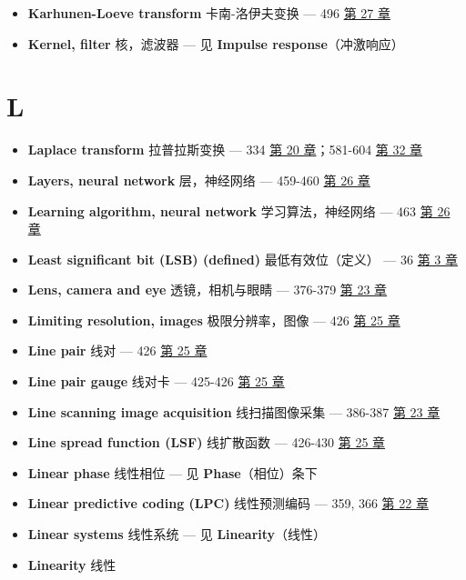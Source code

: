 \begin{itemize}
\tightlist
\item
  \textbf{Karhunen-Loeve transform} 卡南-洛伊夫变换 --- 496 
  \hyperref[ch-27]{第 27 章}
\item
  \textbf{Kernel, filter} 核，滤波器 --- 见 \textbf{Impulse
  response}（冲激响应）
\end{itemize}

\section{L}

\begin{itemize}
\tightlist
\item
  \textbf{Laplace transform} 拉普拉斯变换 --- 334 
  \hyperref[ch-20]{第 20 章}；581-604  \hyperref[ch-32]{第 32
  章}
\item
  \textbf{Layers, neural network} 层，神经网络 --- 459-460 
  \hyperref[ch-26]{第 26 章}
\item
  \textbf{Learning algorithm, neural network} 学习算法，神经网络 --- 463
   \hyperref[ch-26]{第 26 章}
\item
  \textbf{Least significant bit (LSB) (defined)} 最低有效位（定义） ---
  36  \hyperref[ch-03]{第 3 章}
\item
  \textbf{Lens, camera and eye} 透镜，相机与眼睛 --- 376-379 
  \hyperref[ch-23]{第 23 章}
\item
  \textbf{Limiting resolution, images} 极限分辨率，图像 --- 426
   \hyperref[ch-25]{第 25 章}
\item
  \textbf{Line pair} 线对 --- 426  \hyperref[ch-25]{第 25 章}
\item
  \textbf{Line pair gauge} 线对卡 --- 425-426 
  \hyperref[ch-25]{第 25 章}
\item
  \textbf{Line scanning image acquisition} 线扫描图像采集 --- 386-387
   \hyperref[ch-23]{第 23 章}
\item
  \textbf{Line spread function (LSF)} 线扩散函数 --- 426-430 
  \hyperref[ch-25]{第 25 章}
\item
  \textbf{Linear phase} 线性相位 --- 见 \textbf{Phase}（相位）条下
\item
  \textbf{Linear predictive coding (LPC)} 线性预测编码 --- 359, 366
   \hyperref[ch-22]{第 22 章}
\item
  \textbf{Linear systems} 线性系统 --- 见 \textbf{Linearity}（线性）
\item
  \textbf{Linearity} 线性


\end{itemize}
